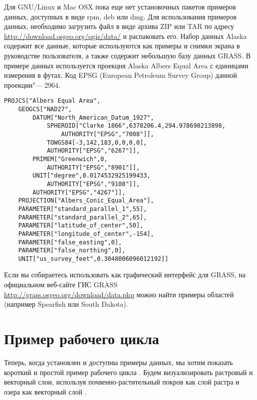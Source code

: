 \nix \osx Для GNU/Linux и Mac OSX пока еще нет установочных пакетов
примеров данных, доступных в виде rpm, deb или dmg. Для использования
примеров данных, необходимо загрузить файл 
в виде архива ZIP или TAR по адресу
\url{http://download.osgeo.org/qgis/data/} и распаковать его. Набор
данных Alaska содержит все данные, которые используются как примеры и
снимки экрана в руководстве пользователя, а также содержит небольшую
базу данных GRASS. В примере данных используется проекция Alaska Albers
Equal Area с единицами измерения в футах. Код EPSG (European Petroleum
Survey Group) данной проекции"--- 2964.

\begin{verbatim}
PROJCS["Albers Equal Area",
    GEOGCS["NAD27",
        DATUM["North_American_Datum_1927",
            SPHEROID["Clarke 1866",6378206.4,294.978698213898,
                AUTHORITY["EPSG","7008"]],
            TOWGS84[-3,142,183,0,0,0,0],
            AUTHORITY["EPSG","6267"]],
        PRIMEM["Greenwich",0,
            AUTHORITY["EPSG","8901"]],
        UNIT["degree",0.0174532925199433,
            AUTHORITY["EPSG","9108"]],
        AUTHORITY["EPSG","4267"]],
    PROJECTION["Albers_Conic_Equal_Area"],
    PARAMETER["standard_parallel_1",55],
    PARAMETER["standard_parallel_2",65],
    PARAMETER["latitude_of_center",50],
    PARAMETER["longitude_of_center",-154],
    PARAMETER["false_easting",0],
    PARAMETER["false_northing",0],
    UNIT["us_survey_feet",0.3048006096012192]]
\end{verbatim}

Если вы собираетесь использовать \qg как графический интерфейс для
GRASS, на официальном веб-сайте ГИС GRASS \\
\url{http://grass.osgeo.org/download/data.php} можно найти примеры
областей (например Spearfish или South Dakota).

\section{Пример рабочего цикла}\label{samplesession}

Теперь, когда \qg установлен и доступны примеры данных, мы хотим
показать короткий и простой пример рабочего цикла \qg. Будем
визуализировать растровый и векторный слои, используя
почвенно-растительный покров как слой растра
 и озера как векторный
слой .


